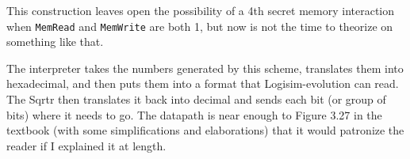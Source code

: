 \documentclass[12pt, oneside]{memoir}
\begin{document}
This construction leaves open the possibility of a 4th secret memory interaction when \texttt{MemRead} and \texttt{MemWrite} are both 1, but now is not the time to theorize on something like that.

The interpreter takes the numbers generated by this scheme, translates them into hexadecimal, and then puts them into a format that Logisim-evolution can read. The Sqrtr then translates it back into decimal and sends each bit (or group of bits) where it needs to go. The datapath is near enough to Figure 3.27 in the textbook (with some simplifications and elaborations) that it would patronize the reader if I explained it at length.

\end{document}
